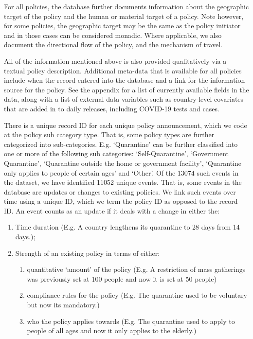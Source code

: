 \documentclass[
]{article}
\providecommand{\tightlist}{%
  \setlength{\itemsep}{0pt}\setlength{\parskip}{0pt}}
\begin{document}
For all policies, the database further documents information about the geographic target of the policy and the human or material target of a policy. Note however, for some policies, the geographic target may be the same as the policy initiator and in those cases can be considered monadic. Where applicable, we also document the directional flow of the policy, and the mechanism of travel.

All of the information mentioned above is also provided qualitatively via a textual policy description. Additional meta-data that is available for all policies include when the record entered into the database and a link for the information source for the policy. See the appendix for a list of currently available fields in the data, along with a list of external data variables such as country-level covariates that are added in to daily releases, including COVID-19 tests and cases.

There is a unique record ID for each unique policy announcement, which we code at the policy sub category type. That is, some policy types are further categorized into sub-categories. E.g. `Quarantine' can be further classified into one or more of the following sub categories: `Self-Quarantine', `Government Quarantine', `Quarantine outside the home or government facility', `Quarantine only applies to people of certain ages' and `Other'. Of the 13074 such events in the dataset, we have identified 11052 unique events. That is, some events in the database are updates or changes to existing policies. We link such events over time using a unique ID, which we term the policy ID as opposed to the record ID. An event counts as an update if it deals with a change in either the:

\begin{enumerate}
\def\labelenumi{\arabic{enumi}.}
\tightlist
\item
  Time duration (E.g. A country lengthens its quarantine to 28 days from 14 days.);
\item
  Strength of an existing policy in terms of either:

  \begin{enumerate}
  \def\labelenumii{\alph{enumii}.}
  \tightlist
  \item
    quantitative `amount' of the policy (E.g. A restriction of mass gatherings was previously set at 100 people and now it is set at 50 people)
  \item
    compliance rules for the policy (E.g. The quarantine used to be voluntary but now its mandatory.)
  \item
    who the policy applies towards (E.g. The quarantine used to apply to people of all ages and now it only applies to the elderly.)
  \end{enumerate}
\end{enumerate}
\end{document}

